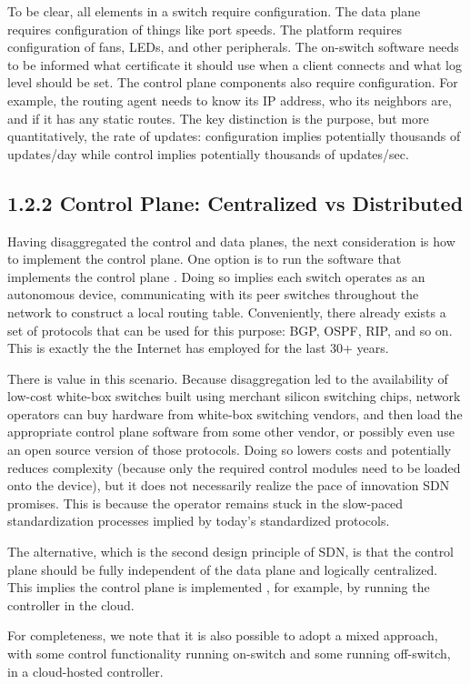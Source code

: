 \documentclass[letterpaper,11pt,english]{sphinxmanual}
\begin{document}
To be clear, all elements in a switch require configuration. The data
plane requires configuration of things like port speeds. The platform
requires configuration of fans, LEDs, and other peripherals.  The
on-switch software needs to be informed what certificate it should use
when a client connects and what log level should be set. The control
plane components also require configuration. For example, the routing
agent needs to know its IP address, who its neighbors are, and if it
has any static routes. The key distinction is the purpose, but more
quantitatively, the rate of updates: configuration implies potentially
thousands of updates/day while control implies potentially thousands
of updates/sec.


\subsection{1.2.2 Control Plane: Centralized vs Distributed}
\label{\detokenize{intro:control-plane-centralized-vs-distributed}}
Having disaggregated the control and data planes, the next
consideration is how to implement the control plane. One option is to
run the software that implements the control plane . Doing
so implies each switch operates as an autonomous device, communicating
with its peer switches throughout the network to construct a local
routing table. Conveniently, there already exists a set of protocols
that can be used for this purpose: BGP, OSPF, RIP, and so on. This is
exactly the  the Internet has employed for
the last 30+ years.

There is value in this scenario. Because disaggregation led to the
availability of low-cost white-box switches built using merchant
silicon switching chips, network operators can buy hardware from
white-box switching vendors, and then load the appropriate control
plane software from some other vendor, or possibly even use an open
source version of those protocols. Doing so lowers costs and
potentially reduces complexity (because only the required control
modules need to be loaded onto the device), but it does not
necessarily realize the pace of innovation SDN promises. This is
because the operator remains stuck in the slow-paced standardization
processes implied by today’s standardized protocols.

The alternative, which is the second design principle of SDN, is that
the control plane should be fully independent of the data plane and
logically centralized. This implies the control plane is implemented
, for example, by running the controller in the cloud. %
\begin{footnote}[3]\sphinxAtStartFootnote
For completeness, we note that it is also possible to adopt a
mixed approach, with some control functionality running
on-switch and some running off-switch, in a cloud-hosted
controller.
%
\end{footnote}
\end{document}
